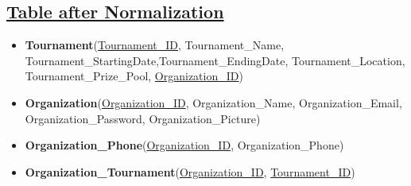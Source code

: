 \subsection*{\underline{Table after Normalization}}

\begin{itemize}
    \item \textbf{Tournament}(\underline{Tournament\_ID}, Tournament\_Name, Tournament\_StartingDate,Tournament\_EndingDate, Tournament\_Location, Tournament\_Prize\_Pool, \underline{Organization\_ID})
    \item \textbf{Organization}(\underline{Organization\_ID}, Organization\_Name, Organization\_Email, Organization\_Password, Organization\_Picture)
    \item \textbf{Organization\_Phone}(\underline{Organization\_ID}, Organization\_Phone)
    \item \textbf{Organization\_Tournament}(\underline{Organization\_ID}, \underline{Tournament\_ID})
\end{itemize}


\clearpage